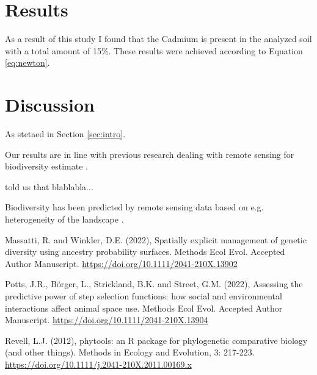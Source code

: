 \documentclass[a4paper, 12pt]{article}
\begin{document}
\section{Results}
As a result of this study I found that the Cadmium is present in the analyzed soil with a total amount of 15\%. These results were achieved according to Equation \ref{eq:newton}.


\section{Discussion}
As stetaed in Section \ref{sec:intro}.

Our results are in line with previous research dealing with remote sensing for biodiversity estimate \citep{Revell_2012, Potts_2022}.

\citet{Revell_2012} told us that blablabla...

Biodiversity has been predicted by remote sensing data based on e.g. heterogeneity of the landscape \citep{Massatti_2022}.

\begin{thebibliography}{999}

Massatti, R. and Winkler, D.E. (2022), Spatially explicit management of genetic diversity using ancestry probability surfaces. Methods Ecol Evol. Accepted Author Manuscript. \url{https://doi.org/10.1111/2041-210X.13902}

Potts, J.R., Börger, L., Strickland, B.K. and Street, G.M. (2022), Assessing the predictive power of step selection functions: how social and environmental interactions affect animal space use. Methods Ecol Evol. Accepted Author Manuscript. \url{https://doi.org/10.1111/2041-210X.13904}

Revell, L.J. (2012), phytools: an R package for phylogenetic comparative biology (and other things). Methods in Ecology and Evolution, 3: 217-223. \url{https://doi.org/10.1111/j.2041-210X.2011.00169.x}

 
\end{thebibliography}
\end{document}
